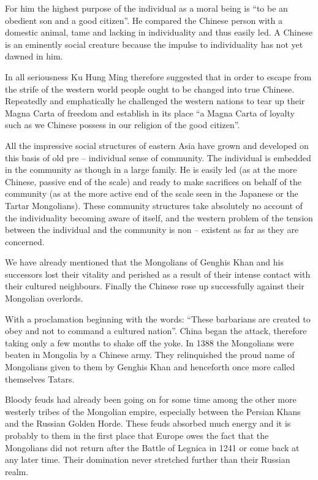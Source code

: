 For him the highest purpose of the individual as a moral being is ``to be an obedient son and a good citizen''. He compared the Chinese person with a domestic animal, tame and lacking in individuality and thus easily led. A Chinese is an eminently social creature because the impulse to individuality has not yet dawned in him.

In all seriousness Ku Hung Ming therefore suggested that in order to escape from the strife of the western world people ought to be changed into true Chinese. Repeatedly and emphatically he challenged the western nations to tear up their Magna Carta of freedom and establish in its place ``a Magna Carta of loyalty such as we Chinese possess in our religion of the good citizen''.

All the impressive social structures of eastern Asia have grown and developed on this basis of old pre -- individual sense of community. The individual is embedded in the community as though in a large family. He is easily led (as at the more Chinese, passive end of the scale) and ready to make sacrifices on behalf of the community (as at the more active end of the scale seen in the Japanese or the Tartar Mongolians). These community structures take absolutely no account of the individuality becoming aware of itself, and the western problem of the tension between the individual and the community is non -- existent as far as they are concerned.

We have already mentioned that the Mongolians of Genghis Khan and his successors lost their vitality and perished as a result of their intense contact with their cultured neighbours. Finally the Chinese rose up successfully against their Mongolian overlords.

With a proclamation beginning with the words: ``These barbarians are created to obey and not to command a cultured nation''. China began the attack, therefore taking only a few months to shake off the yoke. In 1388 the Mongolians were beaten in Mongolia by a Chinese army. They relinquished the proud name of Mongolians given to them by Genghis Khan and henceforth once more called themselves Tatars.

Bloody feuds had already been going on for some time among the other more westerly tribes of the Mongolian empire, especially between the Persian Khans and the Russian Golden Horde. These feuds absorbed much energy and it is probably to them in the first place that Europe owes the fact that the Mongolians did not return after the Battle of Legnica in 1241 or come back at any later time. Their domination never stretched further than their Russian realm.

